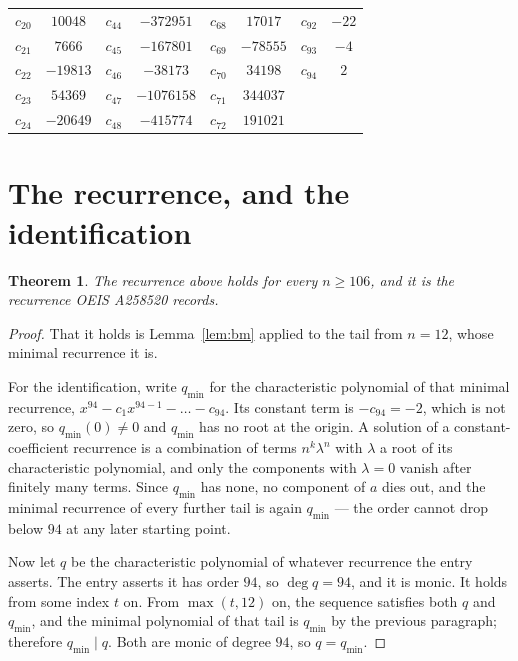 \documentclass[11pt,a4paper]{article}
\theoremstyle{plain}
\newtheorem{theorem}{Theorem}
\theoremstyle{definition}
\begin{document}
\begin{center}
\begin{tabular}{cccccccc}
$c_{20}$ & $10048$ & $c_{44}$ & $-372951$ & $c_{68}$ & $17017$ & $c_{92}$ & $-22$ \\
$c_{21}$ & $7666$ & $c_{45}$ & $-167801$ & $c_{69}$ & $-78555$ & $c_{93}$ & $-4$ \\
$c_{22}$ & $-19813$ & $c_{46}$ & $-38173$ & $c_{70}$ & $34198$ & $c_{94}$ & $2$ \\
$c_{23}$ & $54369$ & $c_{47}$ & $-1076158$ & $c_{71}$ & $344037$ &  &  \\
$c_{24}$ & $-20649$ & $c_{48}$ & $-415774$ & $c_{72}$ & $191021$ &  &  \\
\end{tabular}
\end{center}

\section{The recurrence, and the identification}

\begin{theorem}
The recurrence above holds for every $n\ge106$, and it is the recurrence OEIS A258520 records.
\end{theorem}

\begin{proof}
That it holds is Lemma~\ref{lem:bm} applied to the tail from $n=12$, whose minimal
recurrence it is.

For the identification, write $q_{\min}$ for the characteristic polynomial of that minimal
recurrence, $x^{94}-c_1x^{94-1}-\dots-c_{94}$. Its constant term is
$-c_{94}=-2$, which is not zero, so $q_{\min}(0)\neq0$ and $q_{\min}$ has no
root at the origin. A solution of a constant-coefficient recurrence is a combination of terms
$n^{k}\lambda^{n}$ with $\lambda$ a root of its characteristic polynomial, and only the
components with $\lambda=0$ vanish after finitely many terms. Since $q_{\min}$ has none, no
component of $a$ dies out, and the minimal recurrence of every further tail is again
$q_{\min}$ --- the order cannot drop below $94$ at any later starting point.

Now let $q$ be the characteristic polynomial of whatever recurrence the entry asserts. The
entry asserts it has order $94$, so $\deg q=94$, and it is monic. It holds from some
index $t$ on. From $\max(t,12)$ on, the sequence satisfies both $q$ and $q_{\min}$, and
the minimal polynomial of that tail is $q_{\min}$ by the previous paragraph; therefore
$q_{\min}\mid q$. Both are monic of degree $94$, so $q=q_{\min}$.
\end{proof}
\end{document}
